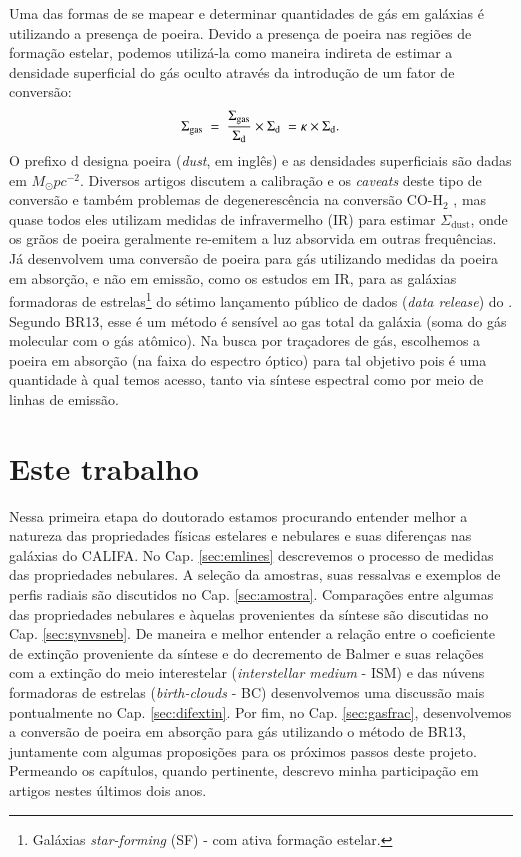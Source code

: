 Uma das formas de se mapear e determinar quantidades de gás em galáxias é utilizando a presença de
poeira. Devido a presença de poeira nas regiões de formação estelar, podemos utilizá-la como maneira
indireta de estimar a densidade superficial do gás oculto através da introdução de um fator de
conversão:
\begin{equation}
	\label{eq:dust2gas}
	\Sigma_{\mathrm{gas}}\ =\ \frac{\Sigma_{\mathrm{gas}}}{\Sigma_{\mathrm{d}}} \times \Sigma_{\mathrm{d}}\ = \kappa \times \Sigma_{\mathrm{d}}. 
\end{equation}
\noindent O prefixo d designa poeira ({\em dust}, em inglês) e as densidades superficiais são dadas
em $M_\odot pc^{-2}$. Diversos artigos discutem a calibração e os {\em caveats} deste tipo de
conversão e também problemas de degenerescência na conversão CO-$\mathrm{H}_2$ \citep{Guiderdoni.Rocca.1987,
Leroy.etal.2011a, Leroy.etal.2013a, RemyRuyer.etal.2014a}, mas quase todos eles utilizam medidas de
infravermelho (IR) para estimar $\Sigma_{\mathrm{dust}}$, onde os grãos de poeira geralmente
re-emitem a luz absorvida em outras frequências. Já \citet[][BR13 daqui em
diante]{Brinchmann.etal.2013a} desenvolvem uma conversão de poeira para gás utilizando medidas da
poeira em absorção, e não em emissão, como os estudos em IR, para as galáxias formadoras de
estrelas\footnote{Galáxias {\em star-forming} (SF) - com ativa formação estelar.} do sétimo
lançamento público de dados ({\em data release}) do \SDSS \citep[][DR7]{Abazajian.etal.2009a}.
Segundo BR13, esse é um método é sensível ao gas total da galáxia (soma do gás molecular com o gás
atômico). Na busca por traçadores de gás, escolhemos a poeira em absorção (na faixa do espectro
óptico) para tal objetivo pois é uma quantidade à qual temos acesso, tanto via síntese espectral
como por meio de linhas de emissão.

\section{Este trabalho}
\label{sec:intro:estetrabalho}

Nessa primeira etapa do doutorado estamos procurando entender melhor a natureza das propriedades
físicas estelares e nebulares e suas diferenças nas galáxias do CALIFA. No Cap. \ref{sec:emlines}
descrevemos o processo de medidas das propriedades nebulares. A seleção da amostras, suas ressalvas
e exemplos de perfis radiais são discutidos no Cap. \ref{sec:amostra}. Comparações entre algumas das
propriedades nebulares e àquelas provenientes da síntese são discutidas no Cap. \ref{sec:synvsneb}.
De maneira e melhor entender a relação entre o coeficiente de extinção proveniente da síntese e do
decremento de Balmer e suas relações com a extinção do meio interestelar ({\em interstellar medium}
- ISM) e das núvens formadoras de estrelas ({\em birth-clouds} - BC) desenvolvemos uma discussão
mais pontualmente no Cap. \ref{sec:difextin}. Por fim, no Cap. \ref{sec:gasfrac}, desenvolvemos a
conversão de poeira em absorção para gás utilizando o método de BR13, juntamente com algumas
proposições para os próximos passos deste projeto. Permeando os capítulos, quando pertinente,
descrevo minha participação em artigos nestes últimos dois anos.

